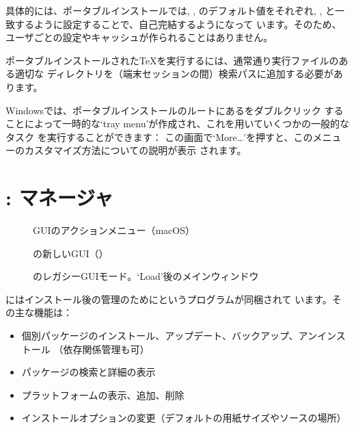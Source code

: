 \documentclass[uplatex,dvipdfmx,12pt,tombow]{jsarticle}
\begin{document}
具体的には、ポータブルインストールでは, , のデフォルト値をそれぞれ, ,
と一致するように設定することで、自己完結するようになって
います。そのため、ユーザごとの設定やキャッシュが作られることはありません。

ポータブルインストールされた\TeX を実行するには、通常通り実行ファイルのある適切な
ディレクトリを（端末セッションの間）検索パスに追加する必要があります。

Windowsでは、ポータブルインストールのルートにあるをダブルクリック
することによって一時的な`tray menu'が作成され、これを用いていくつかの一般的なタスク
を実行することができます：
%
\medskip
{}
\smallskip
%
この画面で`More\ldots'を押すと、このメニューのカスタマイズ方法についての説明が表示
されます。

\section{: \TL マネージャ}
\label{sec:tlmgr}

\begin{figure}[tb]
\caption{ GUIのアクションメニュー（macOS）}
\label{fig:tlshell}
\end{figure}

\begin{figure}[tb]
\caption{の新しい{GUI}（）}
\label{fig:tlcockpit}
\end{figure}

\begin{figure}[tb]
\caption{のレガシーGUIモード。`Load'後のメインウィンドウ}
\label{fig:tlmgr-gui}
\end{figure}

\TL にはインストール後の\TL 管理のためにというプログラムが同梱されて
います。その主な機能は：
%
\begin{itemize}
\item 個別パッケージのインストール、アップデート、バックアップ、アンインストール
  （依存関係管理も可）
\item パッケージの検索と詳細の表示
\item プラットフォームの表示、追加、削除
\item インストールオプションの変更（デフォルトの用紙サイズやソースの場所）
\end{itemize}
\end{document}
